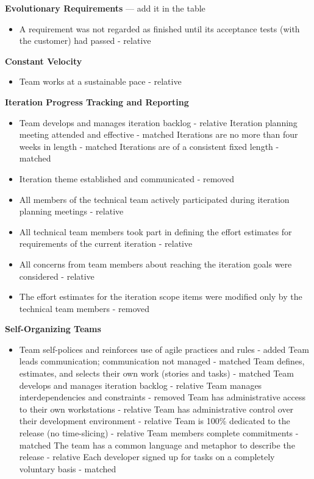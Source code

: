 \begin{appendices}
\textbf{Evolutionary Requirements} --- add it in the table
\begin{itemize}
	\item A requirement was not regarded as finished until its acceptance tests (with the customer) had passed - relative
\end{itemize}
	

\textbf{Constant Velocity}
\begin{itemize}
	\item Team works at a sustainable pace - relative
\end{itemize}

\textbf{Iteration Progress Tracking and Reporting}
\begin{itemize}
	\taar Iteration progress tracked by task to do (burn-down chart) and card acceptance (velocity) - relative
	\taa Iteration backlog defined - matched
	\taa Iteration backlog ranked by priority - matched
	\item Team develops and manages iteration backlog - relative
	\taa Iteration planning meeting attended and effective - matched
	\taa Iterations are no more than four weeks in length - matched
	\taa Iterations are of a consistent fixed length - matched
	\item Iteration theme established and communicated - removed
	\item All members of the technical team actively participated during iteration planning meetings - relative
	\item All technical team members took part in defining the effort estimates for 
requirements of the current iteration - relative
	\item All concerns from team members about reaching the iteration goals were considered - relative
	\item The effort estimates for the iteration scope items were modified only by the  technical team members - removed
\end{itemize}

\textbf{Self-Organizing Teams}
\begin{itemize}
	\item Team self-polices and reinforces use of agile practices and rules - added
	\taa Team leads communication; communication not managed - matched
	\taa Team defines, estimates, and selects their own work (stories and tasks) - matched
	\taa Team develops and manages iteration backlog - relative
	\taa Team manages interdependencies and constraints - removed
	\taa Team has administrative access to their own workstations - relative
	\taa Team has administrative control over their development environment - relative
	\taar Team is 100\% dedicated to the release (no time-slicing) - relative
	\taa Team members complete commitments - matched
	\taar The team has a common language and metaphor to describe the release - relative 
	\pam Each developer signed up for tasks on a completely voluntary basis - matched
\end{itemize}


\end{appendices}
